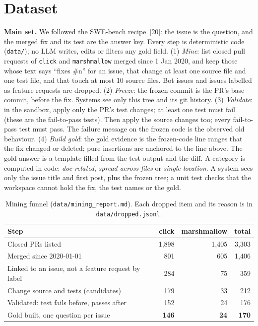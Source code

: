 \documentclass[10pt,a4paper]{article}
\newcommand{\code}[1]{\texttt{\small #1}}
\begin{document}
\section{Dataset}

\textbf{Main set.} We followed the SWE-bench recipe~[20]: the issue is the question, and the merged fix and its test
are the answer key. Every step is deterministic code (\code{data/}); no LLM writes, edits or filters any gold field.
(1) \emph{Mine}: list closed pull requests of \code{click} and \code{marshmallow} merged since 1 Jan 2020, and keep
those whose text says ``fixes \#n'' for an issue, that change at least one source file and one test file, and that
touch at most 10 source files. Bot issues and issues labelled as feature requests are dropped. (2) \emph{Freeze}: the
frozen commit is the PR's base commit, before the fix. Systems see only this tree and its git history. (3)
\emph{Validate}: in the sandbox, apply only the PR's test changes; at least one test must fail (these are the
fail-to-pass tests). Then apply the source changes too; every fail-to-pass test must pass. The failure message on the
frozen code is the observed old behaviour. (4) \emph{Build gold}: the gold evidence is the frozen-code line ranges
that the fix changed or deleted; pure insertions are anchored to the line above. The gold answer is a template filled
from the test output and the diff. A category is computed in code: \emph{doc-related}, \emph{spread across files} or
\emph{single location}. A system sees only the issue title and first post, plus the frozen tree; a unit test checks
that the workspace cannot hold the fix, the test names or the gold.

\begin{table}[!htb]
\centering\small
\caption{Mining funnel (\code{data/mining\_report.md}). Each dropped item and its reason is in \code{data/dropped.jsonl}.}
\begin{tabular}{lrrr}
\toprule
Step & click & marshmallow & total\\
\midrule
Closed PRs listed & 1,898 & 1,405 & 3,303\\
Merged since 2020-01-01 & 801 & 605 & 1,406\\
Linked to an issue, not a feature request by label & 284 & 75 & 359\\
Change source and tests (candidates) & 179 & 33 & 212\\
Validated: test fails before, passes after & 152 & 24 & 176\\
Gold built, one question per issue & \textbf{146} & \textbf{24} & \textbf{170}\\
\bottomrule
\end{tabular}
\end{table}
\end{document}
